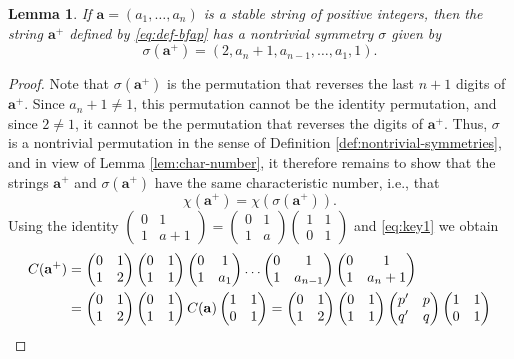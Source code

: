\documentclass[10pt]{article}
\newtheorem{lemma}{Lemma}
\theoremstyle{definition}
\numberwithin{equation}{section}
\numberwithin{lemma}{section}
\newcommand{\bfa}{\mathbf{a}}
\newcommand{\bfap}{\bfa^+}
\newcommand{\mat}[1]{\begin{pmatrix} 0 & 1\\ 1 & #1\end{pmatrix}}
\begin{document}
\begin{lemma}
\label{lem:stable-to-nontrivial-symmetries}
If $\bfa=(a_1,\dots,a_n)$ is a stable string of positive integers, then
the string $\bfap$ defined by \eqref{eq:def-bfap}
has a nontrivial symmetry $\sigma$ given by 
\begin{equation}
\label{eq:proof1.4-nontrivial-symmetry}
\sigma(\bfap)=(2,a_{n}+1,a_{n-1},\dots,a_1,1).
\end{equation}
\end{lemma}

\begin{proof}
Note that $\sigma(\bfap)$ is the permutation that reverses the last
$n+1$ digits of $\bfap$. Since $a_n+1\not=1$, 
this permutation cannot be the identity permutation, and since
$2\not=1$, it cannot be the permutation that reverses the digits of
$\bfap$.  Thus, $\sigma$ is a nontrivial permutation in the sense of
Definition \ref{def:nontrivial-symmetries}, and in view of 
Lemma \ref{lem:char-number}, it therefore remains to show that the strings
$\bfap$ and $\sigma(\bfap)$ have the same characteristic number, i.e., 
that
\begin{equation}
\label{eq:proof1.4-char-number-equality}
\chi(\bfap)=\chi(\sigma(\bfap)).
\end{equation}
Using 
the identity
$\left(\begin{smallmatrix} 0&1\\1&a+1\end{smallmatrix}\right)=
\left(\begin{smallmatrix} 0&1\\1&a\end{smallmatrix}\right)
\left(\begin{smallmatrix} 1&1\\0&1\end{smallmatrix}\right)$
and \eqref{eq:key1} 
we obtain 
\begin{align}
\notag
C(\bfap)&
=\mat{2}\mat{1}\mat{a_1}\dots\mat{a_{n-1}}\mat{a_n+1}
\\
\notag
&=\mat{2}\mat{1}C(\bfa)\begin{pmatrix} 1&1 \\ 0 & 1\end{pmatrix}
=\mat{2}\mat{1}
\begin{pmatrix} p'&p\\q'&q\end{pmatrix}
\begin{pmatrix} 1&1 \\ 0 & 1\end{pmatrix}

\end{align}
\end{proof}
\end{document}
